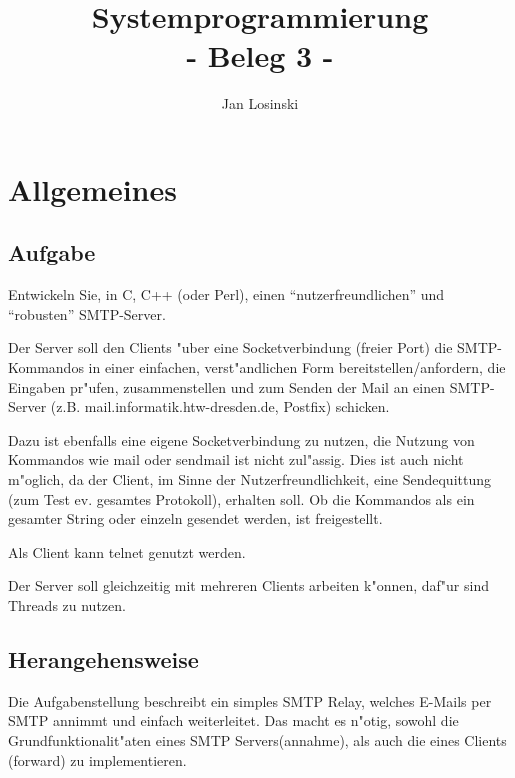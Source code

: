 \documentclass[pdftex,final,a4paper,10pt,notitlepage,halfparskip]{scrreprt}
\title{Systemprogrammierung\\
- Beleg 3 -}
\author{Jan Losinski}
\begin{document}
\maketitle

\tableofcontents

\chapter{Allgemeines}
\section{Aufgabe}
Entwickeln Sie, in C, C++ (oder Perl), einen "`nutzerfreundlichen"' und "`robusten"' SMTP-Server.

Der Server soll den Clients "{u}ber eine Socketverbindung (freier Port) die SMTP-Kommandos in einer einfachen, verst"{a}ndlichen Form bereitstellen/anfordern, die Eingaben pr"{u}fen, zusammenstellen und zum Senden der Mail an einen SMTP-Server (z.B. mail.informatik.htw-dresden.de, Postfix) schicken. 

Dazu ist ebenfalls eine eigene Socketverbindung zu nutzen, die Nutzung von Kommandos wie mail oder sendmail ist nicht zul"{a}ssig. Dies ist auch nicht m"{o}glich, da der Client, im Sinne der Nutzerfreundlichkeit, eine Sendequittung (zum Test ev. gesamtes Protokoll), erhalten soll. Ob die Kommandos als ein gesamter String oder einzeln gesendet werden, ist freigestellt.

Als Client kann telnet genutzt werden.

Der Server soll gleichzeitig mit mehreren Clients arbeiten k"{o}nnen, daf"{u}r sind Threads zu nutzen.

\section{Herangehensweise}
Die Aufgabenstellung beschreibt ein simples SMTP Relay, welches E-Mails per SMTP annimmt und einfach weiterleitet. Das macht es n"{o}tig, sowohl die Grundfunktionalit"{a}ten eines SMTP Servers(annahme), als auch die eines Clients (forward) zu implementieren.
\end{document}
